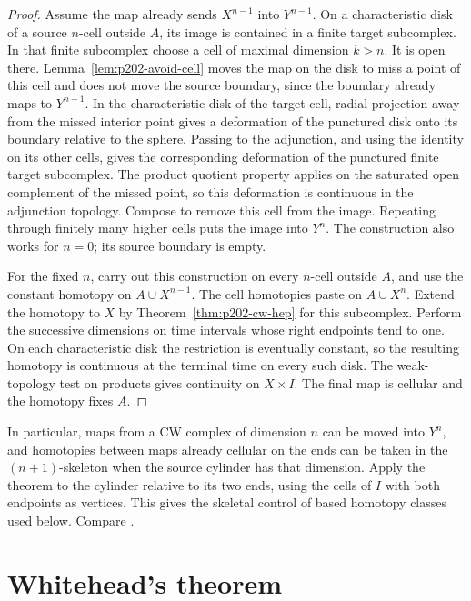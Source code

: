 \documentclass[11pt,oneside,openany]{book}
\theoremstyle{plain}
\theoremstyle{definition}
\theoremstyle{remark}
\begin{document}
\begin{proof}
Assume the map already sends \(X^{n-1}\) into
\(Y^{n-1}\). On a characteristic disk of a source
\(n\)-cell outside \(A\), its image is contained in a
finite target subcomplex. In that finite subcomplex
choose a cell of maximal dimension \(k>n\). It is
open there. Lemma~\ref{lem:p202-avoid-cell} moves the
map on the disk to miss a point of this cell and
does not move the source boundary, since the boundary
already maps to \(Y^{n-1}\).
In the characteristic disk of the target cell, radial
projection away from the missed interior point gives
a deformation of the punctured disk onto its boundary
relative to the sphere. Passing to the adjunction,
and using the identity on its other cells, gives the
corresponding deformation of the punctured finite target
subcomplex. The product quotient property applies on
the saturated open complement of the missed point,
so this deformation is continuous in the adjunction
topology. Compose to remove this cell from the image.
Repeating through finitely many higher cells puts the
image into \(Y^n\). The construction also works for
\(n=0\); its source boundary is empty.

For the fixed \(n\), carry out this construction on
every \(n\)-cell outside \(A\), and use the constant
homotopy on \(A\cup X^{n-1}\). The cell homotopies
paste on \(A\cup X^n\). Extend the homotopy to \(X\)
by Theorem~\ref{thm:p202-cw-hep} for this subcomplex.
Perform the successive dimensions on time intervals
whose right endpoints tend to one. On each
characteristic disk the restriction is eventually
constant, so the resulting homotopy is continuous at
the terminal time on every such disk. The weak-topology
test on products gives continuity on \(X\times I\).
The final map is cellular and the homotopy fixes \(A\).
\end{proof}

In particular, maps from a CW complex of dimension \(n\)
can be moved into \(Y^n\), and homotopies between maps
already cellular on the ends can be taken in the
\((n+1)\)-skeleton when the source cylinder has that
dimension. Apply the theorem to the cylinder relative
to its two ends, using the cells of \(I\) with both
endpoints as vertices. This gives the skeletal control
of based homotopy classes used below. Compare
\cite[Section 4.1]{Hatcher}.

\section{Whitehead's theorem}\label{p202:T13}
\end{document}
